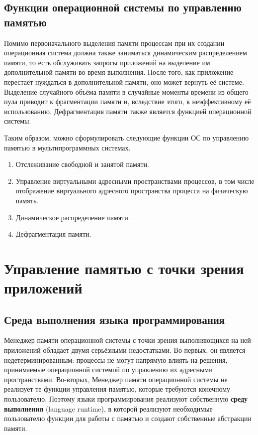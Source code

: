 \subsection{Функции операционной системы по управлению памятью}

Помимо первоначального выделения памяти процессам при их создании операционная система должна также заниматься динамическим распределением памяти, то есть обслуживать запросы приложений на выделение им дополнительной памяти во время выполнения. После того, как приложение перестаёт нуждаться в дополнительной памяти, оно может вернуть её системе. Выделение случайного объёма памяти в случайные моменты времени из общего пула приводит к фрагментации памяти и, вследствие этого, к неэффективному её использованию. Дефрагментация памяти также является функцией операционной системы.

Таким образом, можно сформулировать следующие функции ОС по управлению памятью в мультипрограммных системах.

\begin{enumerate}[label*=\arabic*.]
	\item Отслеживание свободной и занятой памяти.
	\item Управление виртуальными адресными пространствами процессов, в том числе отображение виртуального адресного пространства процесса на физическую память.
	\item Динамическое распределение памяти. 
	\item Дефрагментация памяти. 
\end{enumerate}


\section{Управление памятью с точки зрения приложений}

\subsection{Среда выполнения языка программирования}

Менеджер памяти операционной системы с точки зрения выполняющихся на ней приложений обладает двумя серьёзными недостатками. Во-первых, он является недетерминированным: процессы не могут напрямую влиять на решения, принимаемые операционной системой по управлению их адресными пространствами. Во-вторых, Менеджер памяти операционной системы не реализует те функции управления памятью, которые требуются конечному пользователю. Поэтому языки программирования реализуют собственную \textbf{среду выполнения} (language runtime), в которой реализуют необходимые пользователю функции для работы с памятью и создают собственные абстракции памяти.


